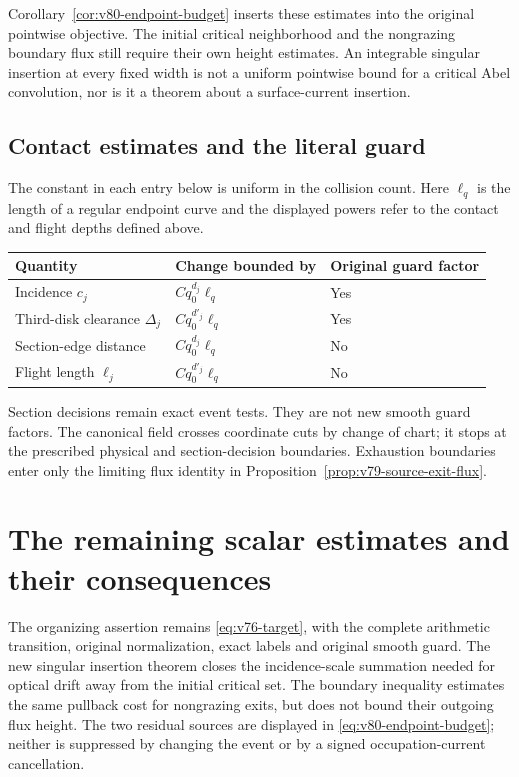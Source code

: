 \documentclass[11pt,reqno]{amsart}
\numberwithin{equation}{section}
\theoremstyle{definition}
\theoremstyle{remark}\newtheorem{remark}[theorem]{Remark}
\begin{document}
Corollary~\ref{cor:v80-endpoint-budget} inserts these estimates into
the original pointwise objective. The initial critical neighborhood
and the nongrazing boundary flux still require their own height
estimates. An integrable singular insertion at every fixed width is
not a uniform pointwise bound for a critical Abel convolution, nor
is it a theorem about a surface-current insertion.

\subsection{Contact estimates and the literal guard}
The constant in each entry below is uniform in the collision count.
Here $\ell_q$ is the length of a regular endpoint curve and the displayed
powers refer to the contact and flight depths defined above.
\begin{center}
\begin{tabular}{lll}
Quantity & Change bounded by & Original guard factor\\[2pt]
\hline
Incidence $c_j$ & $Cq_0^{d_j}\ell_q$ & Yes\\
Third-disk clearance $\Delta_j$ & $Cq_0^{d'_j}\ell_q$ & Yes\\
Section-edge distance & $Cq_0^{d_j}\ell_q$ & No\\
Flight length $\ell_j$ & $Cq_0^{d'_j}\ell_q$ & No
\end{tabular}
\end{center}
Section decisions remain exact event tests. They are not new smooth
guard factors. The canonical field crosses coordinate cuts by change
of chart; it stops at the prescribed physical and section-decision
boundaries. Exhaustion boundaries enter only the limiting flux identity
in Proposition~\ref{prop:v79-source-exit-flux}.











\section{The remaining scalar estimates and their consequences}
The organizing assertion remains \eqref{eq:v76-target}, with the
complete arithmetic transition, original normalization, exact labels
and original smooth guard. The new singular insertion theorem closes
the incidence-scale summation needed for optical drift away from the
initial critical set. The boundary inequality estimates the same
pullback cost for nongrazing exits, but does not bound their outgoing
flux height. The two residual sources are displayed in
\eqref{eq:v80-endpoint-budget}; neither is suppressed by changing the
event or by a signed occupation-current cancellation.
\end{document}
